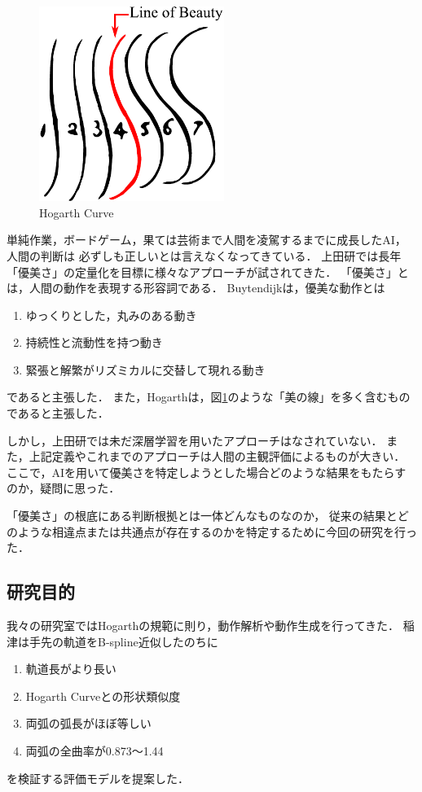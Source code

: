 \begin{figure}[t]
  \begin{center}
    \includegraphics[width=60mm]{images/quote/hogarth_curve.pdf}
  \end{center}
  \caption{Hogarth Curve}
  \label{hogarth_curve}
\end{figure}

単純作業，ボードゲーム，果ては芸術まで人間を凌駕するまでに成長したAI，人間の判断は
必ずしも正しいとは言えなくなってきている．
上田研では長年「優美さ」の定量化を目標に様々なアプローチが試されてきた．
「優美さ」とは，人間の動作を表現する形容詞である．
Buytendijk\cite{buytendijk}は，優美な動作とは
\begin{enumerate}
  \item ゆっくりとした，丸みのある動き
  \item 持続性と流動性を持つ動き
  \item 緊張と解繁がリズミカルに交替して現れる動き
\end{enumerate}
であると主張した．
また，Hogarth\cite{hogarth}は，図\ref{hogarth_curve}のような「美の線」を多く含むものであると主張した．

しかし，上田研では未だ深層学習を用いたアプローチはなされていない．
また，上記定義やこれまでのアプローチは人間の主観評価によるものが大きい．
ここで，AIを用いて優美さを特定しようとした場合どのような結果をもたらすのか，疑問に思った．

「優美さ」の根底にある判断根拠とは一体どんなものなのか，
従来の結果とどのような相違点または共通点が存在するのかを特定するために今回の研究を行った．
\clearpage

\subsection{研究目的}
我々の研究室ではHogarthの規範に則り，動作解析や動作生成を行ってきた．
稲津\cite{inazu}は手先の軌道をB-spline近似\cite{bspline}したのちに
\begin{enumerate}
  \item 軌道長がより長い
  \item Hogarth Curveとの形状類似度
  \item 両弧の弧長がほぼ等しい
  \item 両弧の全曲率が0.873〜1.44
\end{enumerate}
を検証する評価モデルを提案した．

